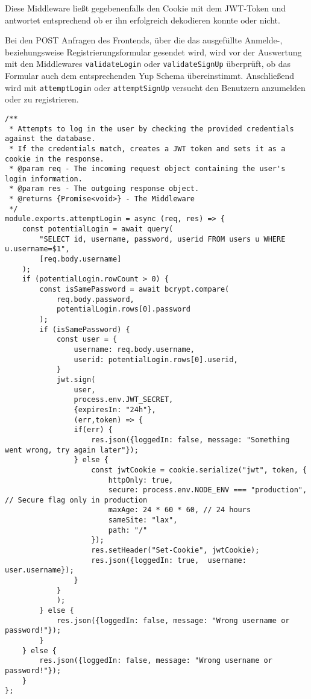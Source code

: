 Diese Middleware ließt gegebenenfalls den Cookie mit dem JWT-Token und antwortet entsprechend ob er ihn erfolgreich dekodieren konnte oder nicht.

Bei den POST Anfragen des Frontends, über die das ausgefüllte Anmelde-, beziehungsweise Registrierungsformular gesendet wird, wird vor der Auswertung mit den Middlewares \verb|validateLogin| oder \verb|validateSignUp| überprüft, ob das Formular auch dem entsprechenden Yup Schema übereinstimmt. Anschließend wird mit \verb|attemptLogin| oder \verb|attemptSignUp| versucht den Benutzern anzumelden oder zu registrieren.

\begin{lstlisting}[style=codeStyle, caption={Die attemptLogin Middleware zum Anmelden}, label={lst:attemptLogin}]
/**
 * Attempts to log in the user by checking the provided credentials against the database.
 * If the credentials match, creates a JWT token and sets it as a cookie in the response.
 * @param req - The incoming request object containing the user's login information.
 * @param res - The outgoing response object.
 * @returns {Promise<void>} - The Middleware
 */
module.exports.attemptLogin = async (req, res) => {
    const potentialLogin = await query(
        "SELECT id, username, password, userid FROM users u WHERE u.username=$1",
        [req.body.username]
    );
    if (potentialLogin.rowCount > 0) {
        const isSamePassword = await bcrypt.compare(
            req.body.password,
            potentialLogin.rows[0].password
        );
        if (isSamePassword) {
            const user = {
                username: req.body.username,
                userid: potentialLogin.rows[0].userid,
            }
            jwt.sign(
                user,
                process.env.JWT_SECRET,
                {expiresIn: "24h"},
                (err,token) => {
                if(err) {
                    res.json({loggedIn: false, message: "Something went wrong, try again later"});
                } else {
                    const jwtCookie = cookie.serialize("jwt", token, {
                        httpOnly: true,
                        secure: process.env.NODE_ENV === "production", // Secure flag only in production
                        maxAge: 24 * 60 * 60, // 24 hours
                        sameSite: "lax",
                        path: "/"
                    });
                    res.setHeader("Set-Cookie", jwtCookie);
                    res.json({loggedIn: true,  username: user.username});
                }
            }
            );
        } else {
            res.json({loggedIn: false, message: "Wrong username or password!"});
        }
    } else {
        res.json({loggedIn: false, message: "Wrong username or password!"});
    }
};
\end{lstlisting}

